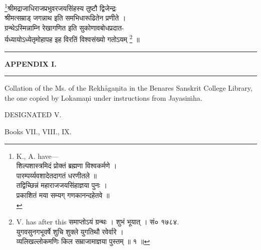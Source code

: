 \documentclass[11pt, openany]{book}
\begin{document}
\begin{center}
{\small \renewcommand{\thefootnote}{१}\footnote{{\en K., A. have---}\\

शिल्पशास्त्रमिदं प्रोक्तं ब्रह्मणा विश्वकर्मणे ।\\
पारम्पर्य्यवशादेतदागतं धरणीतले ॥\\
तद्विच्छिन्नं महाराजजयसिंहाज्ञया पुनः ।\\
प्रकाशितं मया सम्यग् गणकानन्दहेतवे ॥\\}श्रीमद्राजाधिराजप्रभुवरजयसिंहस्य तुष्टौ द्विजेन्द्रः\\
श्रीमत्सम्राड् जगन्नाथ इति समभिधारूढितेन प्रणीते ।\\

ग्रन्थेऽस्मिन्नाम्नि रेखागणित इति सुकोणावबोधप्रदात-\\

र्यध्यायोऽध्येतृमोहापह इह विरतिं विश्वसंख्यो गतोऽयम् \renewcommand{\thefootnote}{२}\footnote{{\en V. has after this} समाप्तोऽयं ग्रन्थः । शुभं भूयात् । सं० १७८४.\\
युगवसुनगभूवर्षे शुचि शुक्ले युगतिथौ रवेर्वारे ।\\ 
व्यलिखल्लोकमणिः किल सम्राजामाज्ञया पुस्तम् ॥ १ ॥} ॥}\\

\rule{0.7in}{0.3pt}
\end{center}

\newpage
\afterpage{\fancyhead[CE] {}}
\afterpage{\fancyhead[CO] {}}
\afterpage{\fancyhead[LE,RO]{\thepage}}
\cfoot{}

\newpage
\renewcommand{\thepage}{\roman{page}}
\setcounter{page}{1}
\thispagestyle{empty}
\begin{center}
\textbf{\en APPENDIX I.}
\vspace{2mm}

\rule{0.4in}{0.3pt}
\end{center}
\vspace{3mm}

{\en Collation of the Ms. of the Rekhȃgaṇita in the Benares Sanskrit College Library, the one copied by Lokamaṇi under instructions from Jayasiṁha.}
\vspace{5mm}

\begin{center}
{\en  DESIGNATED V.}
\vspace{3mm}

Books VII., VIII., IX.
\end{center}
\end{document}
